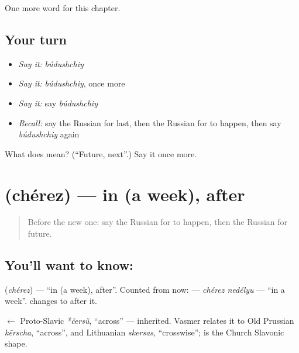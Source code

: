 \begin{grammarlens}[title={What you've built}]
One more word for this chapter.
\end{grammarlens}

\subsection*{Your turn}
\begin{itemize}
\raggedright
  \item \emph{Say it:} \emph{búdushchiy}
  \item \emph{Say it:} \emph{búdushchiy}, once more
  \item \emph{Say it:} say \emph{búdushchiy}
  \item \emph{Recall:} say the Russian for last, then the Russian for to happen, then say \emph{búdushchiy} again
\end{itemize}

\begin{tcolorbox}[breakable,colback=teal!4,colframe=teal!35!black,title={Before you move on}]
What does  mean? (\textquotedblleft{}Future, next\textquotedblright{}.) Say it once more.
\end{tcolorbox}
\section[\texorpdfstring{\ru{через} (chérez)}{через (chérez)}]{ (chérez) — in (a week), after}

\label{lesson:RU-C138-cherez}



\begin{quote}
Before the new one: say the Russian for to happen, then the Russian for future.
\end{quote}

\subsection*{You'll want to know: }
\textbf{} (\emph{chérez}) — \textquotedblleft{}in (a week), after\textquotedblright{}. Counted from now: \textbf{ } — \emph{chérez nedélyu} — \textquotedblleft{}in a week\textquotedblright{}. \textbf{} changes to \textbf{} after it.

\begin{cousinweb}
\textbf{} $\leftarrow$ Proto-Slavic \emph{*čersŭ}, \textquotedblleft{}across\textquotedblright{} — inherited. Vasmer relates it to Old Prussian \emph{kērscha}, \textquotedblleft{}across\textquotedblright{}, and Lithuanian \emph{skersas}, \textquotedblleft{}crosswise\textquotedblright{}; \emph{} is the Church Slavonic shape.
\end{cousinweb}

